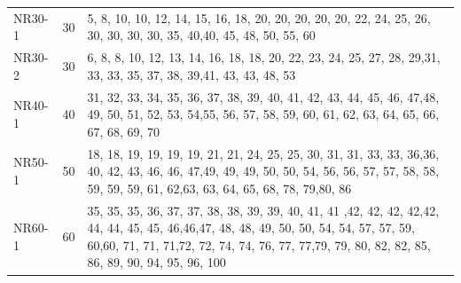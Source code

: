 \documentclass[12pt,a4paper,oneside]{book}
\begin{document}
\begin{tabularx}{\textwidth}{ l c X }
NR30-1 & 30 & 5, 8, 10, 10, 12, 14, 15, 16, 18, 20, 20, 20, 20, 20, 22, 24, 25, 26, 30, 30, 30, 30, 35, 40,40, 45, 48, 50, 55, 60 \\
NR30-2 & 30 & 6, 8, 8, 10, 12, 13, 14, 16, 18, 18, 20, 22, 23, 24, 25, 27, 28, 29,31, 33, 33, 35, 37, 38, 39,41, 43, 43, 48, 53 \\
NR40-1 & 40 & 31, 32, 33, 34, 35, 36, 37, 38, 39, 40, 41, 42, 43, 44, 45, 46, 47,48, 49, 50, 51, 52, 53, 54,55, 56, 57, 58, 59, 60, 61, 62, 63, 64, 65, 66, 67, 68, 69, 70 \\
NR50-1 & 50 & 18, 18, 19, 19, 19, 19, 21, 21, 24, 25, 25, 30, 31, 31, 33, 33, 36,36, 40, 42, 43, 46, 46, 47,49, 49, 49, 50, 50, 54, 56, 56, 57, 57, 58, 58, 59, 59, 59, 61, 62,63, 63, 64, 65, 68, 78, 79,80, 86 \\
NR60-1 & 60 & 35, 35, 35, 36, 37, 37, 38, 38, 39, 39, 40, 41, 41 ,42, 42, 42, 42,42, 44, 44, 45, 45, 46,46,47, 48, 48, 49, 50, 50, 54, 54, 57, 57, 59, 60,60, 71, 71, 71,72, 72, 74, 74, 76, 77, 77,79, 79, 80, 82, 82, 85, 86, 89, 90, 94, 95, 96, 100 \\


\end{tabularx}
\end{document}
